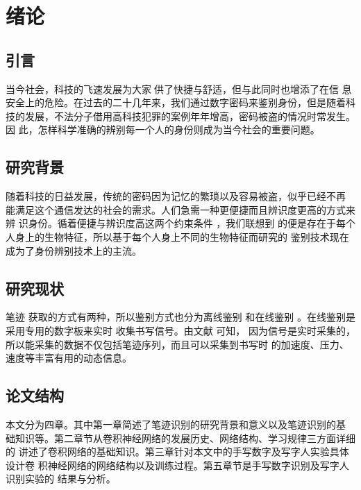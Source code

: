 \chapter{绪论}
\section{引言}

当今社会，科技的飞速发展为大家􏲁供了快捷与舒适，但与此同时也增添了在信
息安全上的危险。在过去的二十几年来，我们通过数字密码来鉴别身份，但是随着科
技的发展，不法分子借用高科技犯罪的案例年年增高，密码被盗的情况时常发生。因
此，怎样科学准确的辨别每一个人的身份则成为当今社会的重要问题。

\section{研究背景}
随着科技的日益发展，传统的密码因为记忆的繁琐以及容易被盗，似乎已经不再 
能满足这个通信发达的社会的需求。人们急需一种更便捷而且辨识度更高的方式来辨 
识身份。循着便捷与辨识度高这两个约束条件 \cite{ELIDRISSI94}，我们联想到
的便是存在于每个人身上的生物特征，所以基于每个人身上不同的生物特征而研究的
鉴别技术现在成为了身份辨别技术上的主流。

\section{研究现状}
笔迹 \cite{imgprocesszh} 获取的方式有两种，所以鉴别方式也分为离线鉴别
和在线鉴别 \cite{lecun1998gradient}。在线鉴别是采用专用的数字板来实时
收集书写信号。由文献\parencite{RManual,kocher99,chen2007ewi} 可知，
因为信号是实时采集的，所以能采集的数据不仅包括笔迹序列，而且可以采集到书写时
的加速度、压力、速度等丰富有用的动态信息。

\section{论文结构}
本文分为四章。其中第一章简述了笔迹识别的研究背景和意义以及笔迹识别的基
础知识等。第二章节从卷积神经网络的发展历史、网络结构、学习规律三方面详细的
讲述了卷积网络的基础知识。第三章针对本文中的手写数字及写字人实验具体设计卷
积神经网络的网络结构以及训练过程。第五章节是手写数字识别及写字人识别实验的
结果与分析。